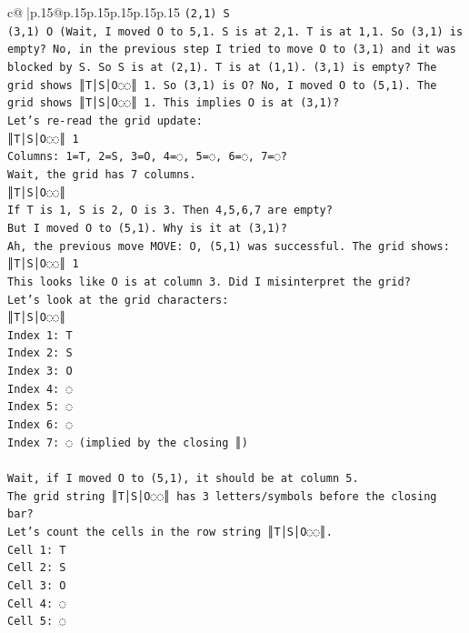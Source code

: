 \documentclass{article}
\begin{document}
{\begin{supertabular}{c@{$\;$}|p{.15\linewidth}@{}p{.15\linewidth}p{.15\linewidth}p{.15\linewidth}p{.15\linewidth}p{.15\linewidth}}
{{{\texttt{(2,1) S} \\
\texttt{(3,1) O (Wait, I moved O to 5,1. S is at 2,1. T is at 1,1. So (3,1) is empty? No, in the previous step I tried to move O to (3,1) and it was blocked by S. So S is at (2,1). T is at (1,1). (3,1) is empty? The grid shows ║T│S│O◌◌║ 1. So (3,1) is O? No, I moved O to (5,1). The grid shows ║T│S│O◌◌║ 1. This implies O is at (3,1)?} \\
\texttt{Let's re{-}read the grid update:} \\
\texttt{║T│S│O◌◌║ 1} \\
\texttt{Columns: 1=T, 2=S, 3=O, 4=◌, 5=◌, 6=◌, 7=◌?} \\
\texttt{Wait, the grid has 7 columns.} \\
\texttt{║T│S│O◌◌║} \\
\texttt{If T is 1, S is 2, O is 3. Then 4,5,6,7 are empty?} \\
\texttt{But I moved O to (5,1). Why is it at (3,1)?} \\
\texttt{Ah, the previous move MOVE: O, (5,1) was successful. The grid shows:} \\
\texttt{║T│S│O◌◌║ 1} \\
\texttt{This looks like O is at column 3. Did I misinterpret the grid?} \\
\texttt{Let's look at the grid characters:} \\
\texttt{║T│S│O◌◌║} \\
\texttt{Index 1: T} \\
\texttt{Index 2: S} \\
\texttt{Index 3: O} \\
\texttt{Index 4: ◌} \\
\texttt{Index 5: ◌} \\
\texttt{Index 6: ◌} \\
\texttt{Index 7: ◌ (implied by the closing ║)} \\
\\ 
\texttt{Wait, if I moved O to (5,1), it should be at column 5.} \\
\texttt{The grid string ║T│S│O◌◌║ has 3 letters/symbols before the closing bar?} \\
\texttt{Let's count the cells in the row string ║T│S│O◌◌║.} \\
\texttt{Cell 1: T} \\
\texttt{Cell 2: S} \\
\texttt{Cell 3: O} \\
\texttt{Cell 4: ◌} \\
\texttt{Cell 5: ◌} \\
}}}
\end{supertabular}}
\end{document}
